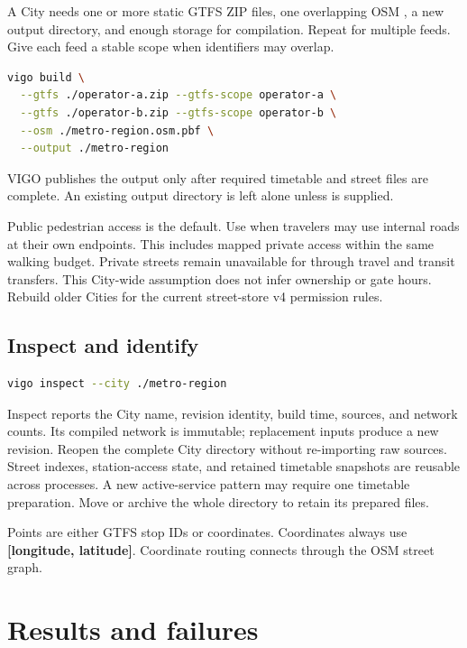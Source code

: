\documentclass[10pt,letterpaper]{article}
\begin{document}
A City needs one or more static GTFS ZIP files, one overlapping OSM , a new output directory, and enough storage for compilation. Repeat  for multiple feeds. Give each feed a stable scope when identifiers may overlap.

\begin{lstlisting}[language=bash]
vigo build \
  --gtfs ./operator-a.zip --gtfs-scope operator-a \
  --gtfs ./operator-b.zip --gtfs-scope operator-b \
  --osm ./metro-region.osm.pbf \
  --output ./metro-region
\end{lstlisting}

VIGO publishes the output only after required timetable and street files are complete. An existing output directory is left alone unless  is supplied.

Public pedestrian access is the default. Use  when travelers may use internal roads at their own endpoints. This includes mapped private access within the same walking budget. Private streets remain unavailable for through travel and transit transfers. This City-wide assumption does not infer ownership or gate hours. Rebuild older Cities for the current street-store v4 permission rules.

\subsection{Inspect and identify}

\begin{lstlisting}[language=bash]
vigo inspect --city ./metro-region
\end{lstlisting}

Inspect reports the City name, revision identity, build time, sources, and network counts. Its compiled network is immutable; replacement inputs produce a new revision. Reopen the complete City directory without re-importing raw sources. Street indexes, station-access state, and retained timetable snapshots are reusable across processes. A new active-service pattern may require one timetable preparation. Move or archive the whole directory to retain its prepared files.

Points are either GTFS stop IDs or coordinates. Coordinates always use \textbf{[longitude, latitude]}. Coordinate routing connects through the OSM street graph.

\section{Results and failures}
\end{document}
